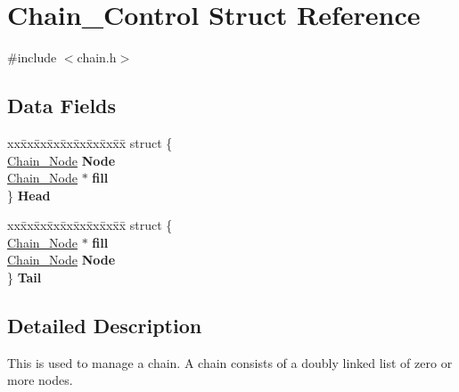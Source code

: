 \hypertarget{unionChain__Control}{}\section{Chain\+\_\+\+Control Struct Reference}
\label{unionChain__Control}


{\ttfamily \#include $<$chain.\+h$>$}

\subsection*{Data Fields}
\begin{DoxyCompactItemize}
\item 
\mbox{\label{unionChain__Control_a1a7c86fd5d727f08af162502ec2dbd96}} 
\begin{tabbing}
xx\=xx\=xx\=xx\=xx\=xx\=xx\=xx\=xx\=\kill
struct \{\\
\>\mbox{\hyperlink{group__RTEMSScoreChain_ga0dd4bfcca1ac7f90de2842e447846d3d}{Chain\_Node}} {\bfseries Node}\\
\>\mbox{\hyperlink{group__RTEMSScoreChain_ga0dd4bfcca1ac7f90de2842e447846d3d}{Chain\_Node}} $\ast$ {\bfseries fill}\\
\} {\bfseries Head}\\

\end{tabbing}\item 
\mbox{\label{unionChain__Control_abc46774b6649813e76ca110393886f3a}} 
\begin{tabbing}
xx\=xx\=xx\=xx\=xx\=xx\=xx\=xx\=xx\=\kill
struct \{\\
\>\mbox{\hyperlink{group__RTEMSScoreChain_ga0dd4bfcca1ac7f90de2842e447846d3d}{Chain\_Node}} $\ast$ {\bfseries fill}\\
\>\mbox{\hyperlink{group__RTEMSScoreChain_ga0dd4bfcca1ac7f90de2842e447846d3d}{Chain\_Node}} {\bfseries Node}\\
\} {\bfseries Tail}\\

\end{tabbing}\end{DoxyCompactItemize}


\subsection{Detailed Description}
This is used to manage a chain. A chain consists of a doubly linked list of zero or more nodes.

